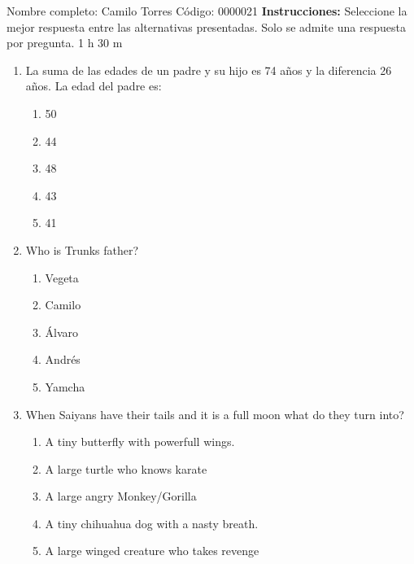 \documentclass[letterpaper,addpoints,answers,twocolumn,10pt]{exam}
\begin{document}
\noindent Nombre completo: Camilo Torres
\newline \newline \newline \newline
Código: 0000021\newline \newline 
{\bf Instrucciones:} Seleccione la mejor respuesta entre las alternativas presentadas. Solo se admite una respuesta por pregunta.
 1 h 30 m

\begin{enumerate}[leftmargin=.2in]




\item  La suma de las edades de un padre y su hijo es 74 años y la diferencia 26 años. La edad del padre es:


\begin{enumerate}[noitemsep,leftmargin=0in]


\item  50
\item  44
\item  48
\item  43
\item  41


\end{enumerate}



\item  Who is Trunks father?


\begin{enumerate}[noitemsep,leftmargin=0in]


\item  Vegeta
\item  Camilo
\item  Álvaro
\item  Andrés
\item  Yamcha


\end{enumerate}



\item  When Saiyans have their tails and it is a full moon what do they turn into?


\begin{enumerate}[noitemsep,leftmargin=0in]


\item  A tiny butterfly with powerfull wings.
\item  A large turtle who knows karate
\item  A large angry Monkey/Gorilla
\item  A tiny chihuahua dog with a nasty breath.
\item  A large winged creature who takes revenge



\end{enumerate}
\end{enumerate}
\end{document}
